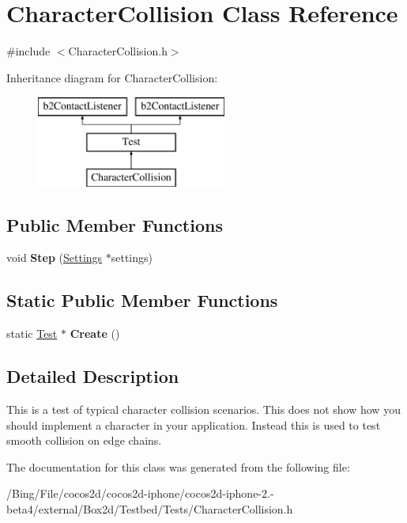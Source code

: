 \hypertarget{class_character_collision}{\section{Character\-Collision Class Reference}
\label{class_character_collision}
}


{\ttfamily \#include $<$Character\-Collision.\-h$>$}

Inheritance diagram for Character\-Collision\-:\begin{figure}[H]
\begin{center}
\leavevmode
\includegraphics[height=3.000000cm]{class_character_collision}
\end{center}
\end{figure}
\subsection*{Public Member Functions}
\begin{DoxyCompactItemize}
\item 
\hypertarget{class_character_collision_a222bd2b0a08f0ad5e4895bc5394541e1}{void {\bfseries Step} (\hyperlink{struct_settings}{Settings} $\ast$settings)}\label{class_character_collision_a222bd2b0a08f0ad5e4895bc5394541e1}

\end{DoxyCompactItemize}
\subsection*{Static Public Member Functions}
\begin{DoxyCompactItemize}
\item 
\hypertarget{class_character_collision_a06517946cc16f09bd7e6cb6e5dd5529c}{static \hyperlink{class_test}{Test} $\ast$ {\bfseries Create} ()}\label{class_character_collision_a06517946cc16f09bd7e6cb6e5dd5529c}

\end{DoxyCompactItemize}


\subsection{Detailed Description}
This is a test of typical character collision scenarios. This does not show how you should implement a character in your application. Instead this is used to test smooth collision on edge chains. 

The documentation for this class was generated from the following file\-:\begin{DoxyCompactItemize}
\item 
/\-Bing/\-File/cocos2d/cocos2d-\/iphone/cocos2d-\/iphone-\/2.-\/beta4/external/\-Box2d/\-Testbed/\-Tests/Character\-Collision.\-h\end{DoxyCompactItemize}
